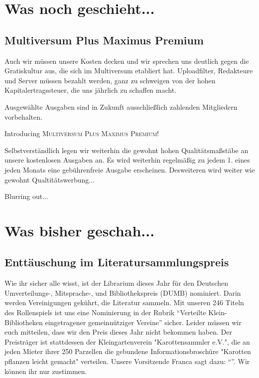 \documentclass[final]{multiversum}
\begin{document}
\makemultititle
%


\section{Was noch geschieht...}

\subsection{Multiversum Plus Maximus Premium}
Auch wir müssen unsere Kosten decken und wir sprechen uns deutlich gegen die Gratiskultur aus, die sich im Multiversum etabliert hat. Uploadfilter, Redakteure und Server müssen bezahlt werden, ganz zu schweigen von der hohen Kapitalertragssteuer, die uns jährlich zu schaffen macht.

Ausgewählte Ausgaben sind in Zukunft ausschließlich zahlenden Mitgliedern vorbehalten.
\begin{center}Introducing \textsc{Multiversum Plus Maximus Premium!}\end{center}

Selbstverständlich legen wir weiterhin die gewohnt hohen Qualitätsmaßstäbe an unsere kostenlosen Ausgaben an.
Es wird weiterhin regelmäßig zu jedem 1. eines jeden Monats eine gebührenfreie Ausgabe erscheinen.
Desweiteren wird weiter wie gewohnt Qualtitätswerbung...

Blurring out...

\section{Was bisher geschah...}

\subsection{Enttäuschung im Literatursammlungspreis}
Wie ihr sicher alle wisst, ist der Librarium dieses Jahr für den Deutschen Umverteilungs-, Mitsprache-, und Bibliothekspreis (DUMB) nominiert.
Darin werden Vereinigungen gekührt, die Literatur sammeln.
Mit unseren 246 Titeln des Rollenspiels ist uns eine Nominierung in der Rubrik \enquote{Verteilte Klein-Bibliotheken eingetragener gemeinnütziger Vereine} sicher.
Leider müssen wir euch mitteilen, dass wir den Preis dieses Jahr nicht bekommen haben.
Der Preisträger ist stattdessen der Kleingartenverein "Karottensammler e.V.", die an jeden Mieter ihrer 250 Parzellen die gebundene Informationsbroschüre "Karotten pflanzen leicht gemacht" verteilen.
Unsere Vorsitzende Franca sagt dazu: \enquote{}.
Wir können ihr nur zustimmen.
\end{document}
